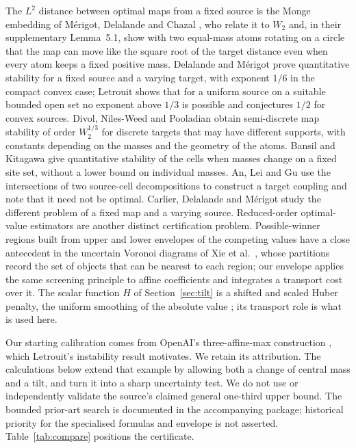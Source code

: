 \documentclass[11pt]{article}
\theoremstyle{remark}
\begin{document}
The $L^2$ distance between optimal maps from a fixed source is the Monge
embedding of M\'erigot, Delalande and Chazal \cite{MDC}, who relate it to
$W_2$ and, in their supplementary Lemma~5.1, show with two equal-mass atoms
rotating on a circle that the map can move like the square root of the
target distance even when every atom keeps a fixed positive mass. Delalande
and M\'erigot \cite{DM} prove quantitative stability for a fixed source and a
varying target, with exponent $1/6$ in the compact convex case; Letrouit
\cite{Let} shows that for a uniform source on a suitable bounded open set no
exponent above $1/3$ is possible and conjectures $1/2$ for convex sources.
Divol, Niles-Weed and Pooladian \cite{DNP} obtain semi-discrete map stability
of order $W_2^{1/3}$ for discrete targets that may have different supports,
with constants depending on the masses and the geometry of the atoms. Bansil
and Kitagawa \cite{BK} give quantitative stability of the cells when masses
change on a fixed site set, without a lower bound on individual masses. An,
Lei and Gu \cite{ALG} use the intersections of two source-cell decompositions
to construct a target coupling and note that it need not be optimal. Carlier,
Delalande and M\'erigot \cite{CDM} study the different problem of a fixed map
and a varying source. Reduced-order optimal-value estimators \cite{BN} are
another distinct certification problem. Possible-winner regions built from
upper and lower envelopes of the competing values have a close antecedent in
the uncertain Voronoi diagrams of Xie et al.\ \cite{Xie}, whose partitions
record the set of objects that can be nearest to each region; our envelope
applies the same screening principle to affine coefficients and integrates a
transport cost over it. The scalar function $H$ of Section~\ref{sec:tilt} is a
shifted and scaled Huber penalty, the uniform smoothing of the absolute value
\cite{RQS}; its transport role is what is used here.

Our starting calibration comes from OpenAI's three-affine-max construction
\cite{OAI}, which Letrouit's instability result motivates. We retain its
attribution. The calculations below extend that example by allowing both a
change of central mass and a tilt, and turn it into a sharp uncertainty test.
We do not use or independently validate the source's claimed general one-third
upper bound. The bounded prior-art search is documented in the accompanying
package; historical priority for the specialised formulas and envelope is not
asserted. Table~\ref{tab:compare} positions the certificate.
\end{document}
